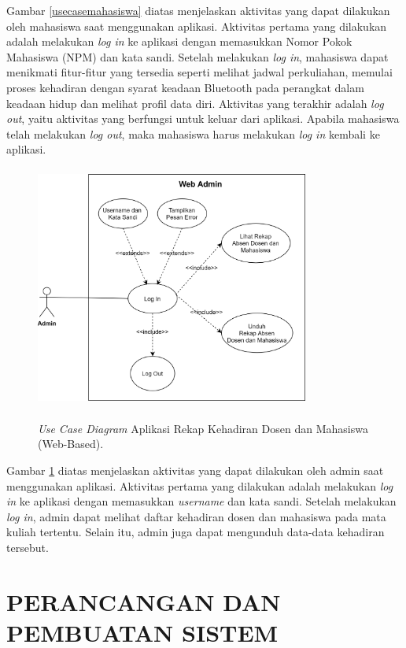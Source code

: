\begin{enumerate}[a.]
\par Gambar \ref{usecasemahasiswa} diatas menjelaskan aktivitas yang dapat dilakukan oleh mahasiswa saat menggunakan aplikasi. Aktivitas pertama yang dilakukan adalah melakukan \textit{log in} ke aplikasi dengan memasukkan Nomor Pokok Mahasiswa (NPM) dan kata sandi. Setelah melakukan \textit{log in}, mahasiswa dapat menikmati fitur-fitur yang tersedia seperti melihat jadwal perkuliahan, memulai proses kehadiran dengan syarat keadaan Bluetooth pada perangkat dalam keadaan hidup dan melihat profil data diri. Aktivitas yang terakhir adalah \textit{log out}, yaitu aktivitas yang berfungsi untuk keluar dari aplikasi. Apabila mahasiswa telah melakukan \textit{log out}, maka mahasiswa harus melakukan \textit{log in} kembali ke aplikasi.

\begin{figure}[H]
	\center
	\shadowbox
	{\includegraphics [width=9cm, height=8cm]{gambar/model/use-case-admin}}
	\caption{\textit{Use Case Diagram} Aplikasi Rekap Kehadiran Dosen dan Mahasiswa (Web-Based).}
	\label{usecaseadmin}
\end{figure}

\par Gambar \ref{usecaseadmin} diatas menjelaskan aktivitas yang dapat dilakukan oleh admin saat menggunakan aplikasi. Aktivitas pertama yang dilakukan adalah melakukan \textit{log in} ke aplikasi dengan memasukkan \textit{username} dan kata sandi. Setelah melakukan \textit{log in}, admin dapat melihat daftar kehadiran dosen dan mahasiswa pada mata kuliah tertentu. Selain itu, admin juga dapat mengunduh data-data kehadiran tersebut.



\section{\uppercase{PERANCANGAN DAN PEMBUATAN SISTEM}}


\end{enumerate}
